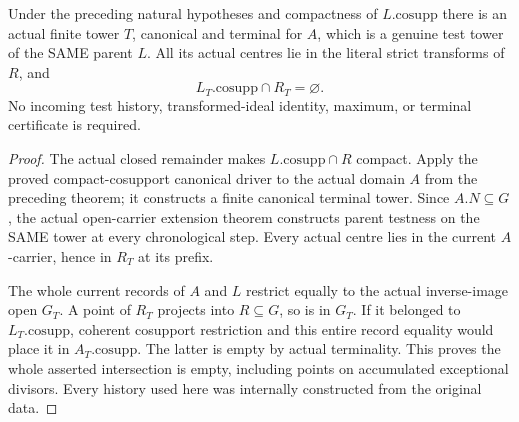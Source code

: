 \begin{theorem}
\label{hir:nc-coefficient-remainder-finite-parent-phase}
\leanok
Under the preceding natural hypotheses and compactness of
$L.\mathrm{cosupp}$ there is an actual finite tower $T$, canonical and terminal
for $A$, which is a genuine test tower of the SAME parent $L$. All its actual
centres lie in the literal strict transforms of $R$, and
\[
 L_T.\mathrm{cosupp}\cap R_T=\varnothing.
\]
No incoming test history, transformed-ideal identity, maximum, or terminal
certificate is required.
\end{theorem}
\begin{proof}
The actual closed remainder makes $L.\mathrm{cosupp}\cap R$ compact. Apply the
proved compact-cosupport canonical driver to the actual domain $A$ from the
preceding theorem; it constructs a finite canonical terminal tower. Since
$A.N\subseteq G$, the actual open-carrier extension theorem constructs parent
testness on the SAME tower at every chronological step. Every actual centre
lies in the current $A$-carrier, hence in $R_T$ at its prefix.

The whole current records of $A$ and $L$ restrict equally to the actual
inverse-image open $G_T$. A point of $R_T$ projects into $R\subseteq G$, so is
in $G_T$. If it belonged to $L_T.\mathrm{cosupp}$, coherent cosupport restriction
and this entire record equality would place it in $A_T.\mathrm{cosupp}$.
The latter is empty by actual terminality. This proves the whole asserted
intersection is empty, including points on accumulated exceptional divisors.
Every history used here was internally constructed from the original data.
\end{proof}

